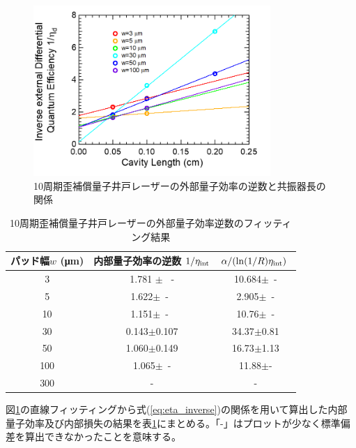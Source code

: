 {\begin{figure}[h]
	\centering
	\includegraphics[width=9cm]{figure/fig_3_1_10QW_broadcontact_id_inverse_02.png}
	\caption{10周期歪補償量子井戸レーザーの外部量子効率の逆数と共振器長の関係}
	\label{fig:fig_3_1_10QW_broadcontact_id_inverse_02}
\end{figure}
\begin{table}[h]
  \caption{10周期歪補償量子井戸レーザーの外部量子効率逆数のフィッティング結果}
  \label{table:table_10QW_i_d_fit}
  \centering
  \begin{tabular}{ccc}
    \hline
    パッド幅$w$ (\si{\micro\metre})  &  内部量子効率の逆数 $1/\eta_{\rm{int}} $ & $\alpha/(\ln(1/R)\eta_{\rm{int}})\ $ \\
    \hline \hline
     3 & 1.781 $\pm$ \ -  & 10.684$\pm$\ - \\
    5  & 1.622$\pm$\ -\  & 2.905$\pm$\ -\\
    10  & 1.151$\pm$\ -\  & 10.76$\pm$\ -\\ 
    30& 0.143$\pm$0.107& 34.37$\pm$0.81\\
    50& 1.060$\pm$0.149&16.73$\pm$1.13 \\
    100& 1.065$\pm$\ -& 11.88$\pm$-\\
    300&- & -\\
    \hline
  \end{tabular}
\end{table}

\newpage
図\ref{fig:fig_3_1_10QW_broadcontact_id_inverse_02}の直線フィッティングから式(\ref{eq:eta_inverse})の関係を用いて算出した内部量子効率及び内部損失の結果を表\ref{table:table_10QW_i_d_fit}にまとめる。「-」はプロットが少なく標準偏差を算出できなかったことを意味する。

}
